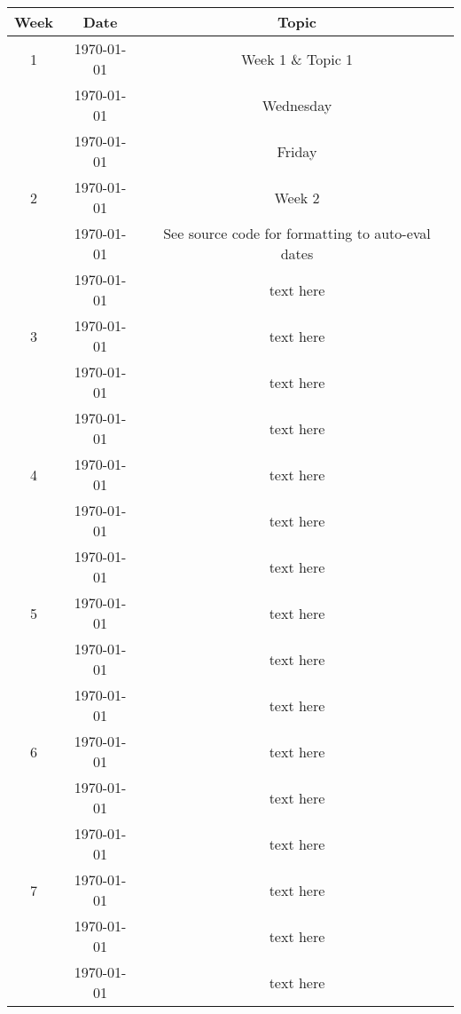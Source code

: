 \documentclass[11pt]{article}
\begin{document}
{	\begin{center}
		\begin{longtable}{| c | c | c |}
			\hline
			\textbf{Week} & \textbf{Date} & \textbf{Topic} \\
			\hline
			\endhead
			1 & \printyearoff\today & Week 1 \& Topic 1 \\
			 & \printyearoff\AdvanceDate[2]\today & Wednesday \\
			  & \printyearoff\AdvanceDate[4]\today & Friday \\
			\hline
			2 & \printyearoff\AdvanceDate[\fpeval{(7*1)+0}]\today & Week 2 \\
			 & \printyearoff\AdvanceDate[\fpeval{(7*1)+2}]\today & See source code for formatting to auto-eval dates \\
			  & \printyearoff\AdvanceDate[\fpeval{(7*1)+4}]\today & text here \\
			\hline
			3 & \printyearoff\AdvanceDate[\fpeval{(7*2)+0}]\today &  text here \\
			& \printyearoff\AdvanceDate[\fpeval{(7*2)+2}]\today & text here \\
			& \printyearoff\AdvanceDate[\fpeval{(7*2)+4}]\today & text here \\
			\hline
			4 & \printyearoff\AdvanceDate[\fpeval{(7*3)+0}]\today & text here \\
			& \printyearoff\AdvanceDate[\fpeval{(7*3)+2}]\today & text here\\
			& \printyearoff\AdvanceDate[\fpeval{(7*3)+4}]\today & text here \\
			\hline
			5 & \printyearoff\AdvanceDate[\fpeval{(7*4)+0}]\today & text here \\
			& \printyearoff\AdvanceDate[\fpeval{(7*4)+2}]\today & text here \\
			& \printyearoff\AdvanceDate[\fpeval{(7*4)+4}]\today & text here \\
			\hline
			6 & \printyearoff\AdvanceDate[\fpeval{(7*5)+0}]\today & text here \\
			& \printyearoff\AdvanceDate[\fpeval{(7*5)+2}]\today & text here \\
			& \printyearoff\AdvanceDate[\fpeval{(7*5)+4}]\today & text here\\
			\hline
			7 & \printyearoff\AdvanceDate[\fpeval{(7*6)+0}]\today & text here  \\
			& \printyearoff\AdvanceDate[\fpeval{(7*6)+2}]\today & text here \\
			& \printyearoff\AdvanceDate[\fpeval{(7*6)+4}]\today & text here \\

\end{longtable}
\end{center}}
\end{document}
